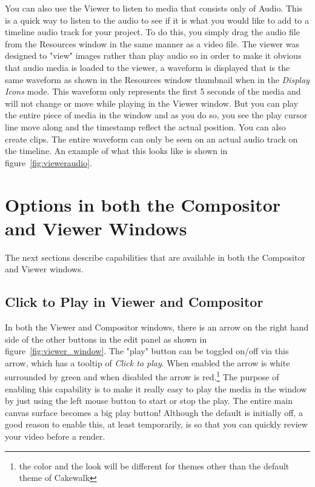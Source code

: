 You can also use the Viewer to listen to media that consists only of Audio.  This is a quick way
to listen to the audio to see if it is what you would like to add to a timeline audio track for
your project.  To do this, you simply drag the audio file from the Resources window in the same
manner as a video file. The viewer was designed to "view" images rather than play audio so in order
to make it obvious that audio media is loaded to the viewer, a waveform is displayed that is the
same waveform as shown in the Resources window thumbnail when in the \textit{Display Icons} mode.
This waveform only represents the first 5 seconds of the media and will not change or move while
playing in the Viewer window.  But you can play the entire piece of media in the window
and as you do so, you see the play cursor line move along and the timestamp reflect the actual
position. You can also create clips. The entire waveform can only be seen on an actual audio track
on the timeline. An example of what this looks like is shown in figure~\ref{fig:vieweraudio}.

\section{Options in both the Compositor and Viewer Windows}%
\label{sec:options_in_both_the_compositor_and_viewer_windows}

The next sections describe capabilities that are available in both the Compositor and Viewer windows.

\subsection{Click to Play in Viewer and Compositor}%
\label{sub:click_to_play_in_viewer_and_compositor}

In both the Viewer and Compositor windows, there is an arrow on the right hand side of the other
buttons in the edit panel as shown in figure~\ref{fig:viewer_window}.  The "play" button can be
toggled on/off via this arrow, which has a tooltip of \textit{Click to play}.  When enabled
the arrow is white surrounded by green and when disabled the arrow is red.\protect\footnote{the color and the look will be different for themes other than the default theme of Cakewalk}
The purpose of enabling this capability is to make it really easy to play the media in the window
by just using the left mouse button to start or stop the play.  The entire main canvas surface
becomes a big play button!  Although the default is initially off, a good reason to enable this,
at least temporarily, is so that you can quickly review your video before a render.
 
